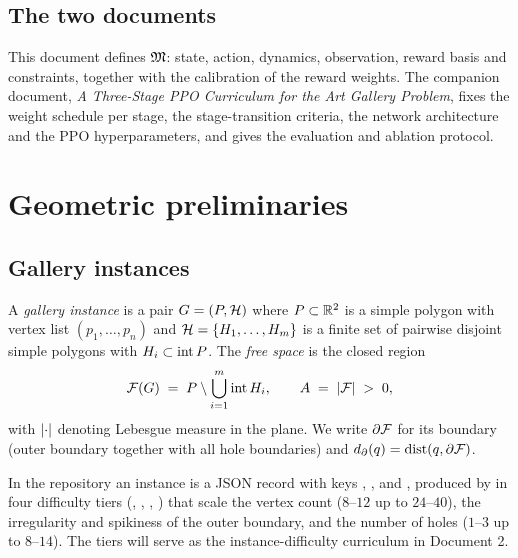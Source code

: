 \documentclass[11pt,a4paper]{article}
\begin{document}
\subsection{The two documents}

This document defines $\mathfrak{M}$: state, action, dynamics, observation, reward basis and
constraints, together with the calibration of the reward weights. The companion document,
\emph{A Three-Stage PPO Curriculum for the Art Gallery Problem}, fixes the weight schedule
per stage, the stage-transition criteria, the network architecture and the PPO
hyperparameters, and gives the evaluation and ablation protocol.

\section{Geometric preliminaries}

\subsection{Gallery instances}

\begin{definition}[Gallery]
A \emph{gallery instance} is a pair $G = (P, \mathcal{H})$ where $P \subset \mathbb{R}^2$
is a simple polygon with vertex list $(p_1,\dots,p_n)$ and
$\mathcal{H} = \{H_1,\dots,H_m\}$ is a finite set of pairwise disjoint simple polygons with
$H_i \subset \operatorname{int}P$. The \emph{free space} is the closed region
\[
  \mathcal{F}(G) \;=\; P \setminus \bigcup_{i=1}^{m} \operatorname{int} H_i ,
  \qquad
  A \;=\; \lvert \mathcal{F} \rvert \;>\; 0 ,
\]
with $\lvert \cdot \rvert$ denoting Lebesgue measure in the plane. We write $\partial\mathcal{F}$ for
its boundary (outer boundary together with all hole boundaries) and
$d_{\partial}(q) = \operatorname{dist}(q, \partial\mathcal{F})$.
\end{definition}

In the repository an instance is a JSON record with keys ,
,  and , produced by
 in four difficulty tiers (, ,
, ) that scale the vertex count ($8$--$12$ up to $24$--$40$), the
irregularity and spikiness of the outer boundary, and the number of holes ($1$--$3$ up to
$8$--$14$). The tiers will serve as the instance-difficulty curriculum in Document 2.
\end{document}
